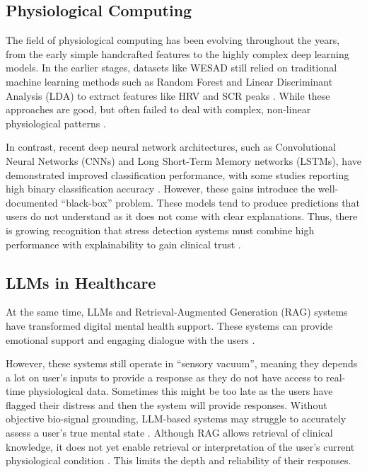 \documentclass[journal,twoside,web]{ieeecolor}
\begin{document}
\subsection{Physiological Computing}
The field of physiological computing has been evolving throughout the years, from the early simple handcrafted features to the highly complex deep learning models. In the earlier stages, datasets like WESAD still relied on traditional machine learning methods such as Random Forest and Linear Discriminant Analysis (LDA) to extract features like HRV and SCR peaks \cite{schmidt2018introducing}. While these approaches are good, but often failed to deal with complex, non-linear physiological 	patterns \cite{saganowski2022emotion}.

In contrast, recent deep neural network architectures, such as Convolutional Neural Networks (CNNs) and Long Short-Term Memory networks (LSTMs), have demonstrated improved classification performance, with some studies reporting high binary classification accuracy \cite{tanwar2022cnn}. However, these gains introduce the well-documented “black-box” problem. These models tend to produce predictions that users do not understand as it does not come with clear explanations. Thus, there is growing recognition that stress detection systems must combine high performance with explainability to gain clinical trust \cite{qiu2025emoagent}.

\subsection{LLMs in Healthcare}
At the same time, LLMs and Retrieval-Augmented Generation (RAG) systems have transformed digital mental health support. These systems can provide emotional support and engaging dialogue with the users \cite{che2017interpretable} \cite{van2023providing}.

However, these systems still operate in “sensory vacuum”, meaning they depends a lot on user’s inputs to provide a response as they do not have access to real-time physiological data. Sometimes this might be too late as the users have flagged their distress and then the system will provide responses. Without objective bio-signal grounding, LLM-based systems may struggle to accurately assess a user’s true mental state \cite{de2024chatbots}. Although RAG allows retrieval of clinical knowledge, it does not yet enable retrieval or interpretation of the user’s current physiological condition \cite{toy2025advantages}. This limits the depth and reliability of their responses.
\end{document}
